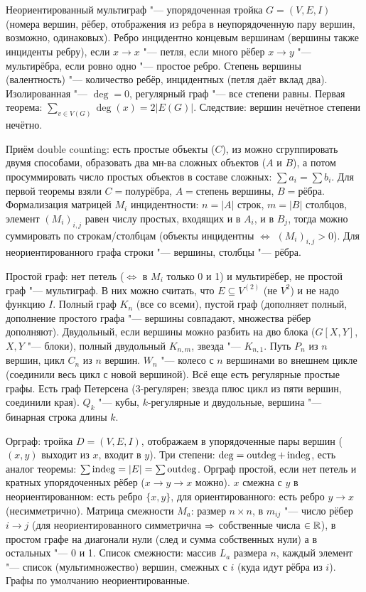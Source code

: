 \section{} %
Неориентированный мультиграф "--- упорядоченная тройка $G=(V, E, I)$ (номера вершин, рёбер, отображения из ребра в неупорядоченную пару вершин, возможно, одинаковых).
Ребро инцидентно концевым вершинам (вершины также инциденты ребру), если $x \to x$ "--- петля, если много рёбер $x \to y$ "--- мультирёбра,
если ровно одно "--- простое ребро.
Степень вершины (валентность) "--- количество ребёр, инцидентных (петля даёт вклад два).
Изолированная "--- $\deg = 0$, регулярный граф "--- все степени равны.
Первая теорема: $\sum_{v \in V(G)} \deg(x) = 2|E(G)|$.
Следствие: вершин нечётное степени нечётно.

Приём double counting: есть простые объекты ($C$), из можно сгруппировать двумя способами, образовать два мн-ва сложных объектов ($A$ и $B$),
а потом просуммировать число простых объектов в составе сложных: $\sum a_i = \sum b_i$.
Для первой теоремы взяли $C=\text{полурёбра}$, $A=\text{степень вершины}$, $B=\text{рёбра}$.
Формализация матрицей $M_i$ инцидентности: $n=|A|$ строк, $m=|B|$ столбцов, элемент $(M_i)_{i,j}$
равен числу простых, входящих и в $A_i$, и в $B_j$, тогда можно суммировать по строкам/столбцам
(объекты инцидентны $\iff$ $(M_i)_{i,j}>0$).
Для неориентированного графа строки "--- вершины, столбцы "--- рёбра.

Простой граф: нет петель ($\iff$ в $M_i$ только 0 и 1) и мультирёбер, не простой граф "--- мультиграф.
В них можно считать, что $E \subseteq V^{(2)}$ (не $V^2$) и не надо функцию $I$.
Полный граф $K_n$ (все со всеми), пустой граф (дополняет полный, дополнение простого графа "--- вершины совпадают, множества рёбер дополняют).
Двудольный, если вершины можно разбить на дво блока ($G[X, Y]$, $X, Y$ "--- блоки), полный двудольный $K_{n,m}$, звезда "--- $K_{n,1}$.
Путь $P_n$ из $n$ вершин, цикл $C_n$ из $n$ вершин.
$W_n$ "--- колесо с $n$ вершинами во внешнем цикле (соединили весь цикл с новой вершиной).
Всё еще есть регулярные простые графы.
Есть граф Петерсена (3-регулярен; звезда плюс цикл из пяти вершин, соединили края).
$Q_k$ "--- кубы, $k$-регулярные и двудольные, вершина "--- бинарная строка длины $k$.

Орграф: тройка $D=(V,E,I)$, отображаем в упорядоченные пары вершин ($(x, y)$ выходит из $x$, входит в $y$). 
Три степени: $\deg = \operatorname{outdeg} + \operatorname{indeg}$, есть аналог теоремы: $\sum \operatorname{indeg} = |E| = \sum \operatorname{outdeg}$.
Орграф простой, если нет петель и кратных упорядоченных рёбер ($x \to y \to x$ можно).
$x$ смежна с $y$ в неориентированном: есть ребро $\{x, y\}$, для ориентированного: есть ребро $y\to x$ (несимметрично).
Матрица смежности $M_a$: размер $n \times n$, в $m_{ij}$ "--- число рёбер $i\to j$ (для неориентированного симметрична $\Rightarrow$
собственные числа $\in \mathbb{R}$), в простом графе на диагонали нули (след и сумма собственных нули) а в остальных "--- 0 и 1.
Список смежности: массив $L_a$ размера $n$, каждый элемент "--- список (мультимножество) вершин, смежных с $i$ (куда идут рёбра из $i$).
Графы по умолчанию неориентированные.

